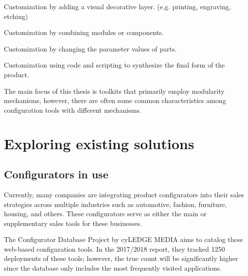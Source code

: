 \begin{definition}[Veneer]
Customization by adding a visual decorative layer. (e.g. printing, engraving, etching)
\end{definition}
\begin{definition}[Modularity]
Customization by combining modules or components.
\end{definition}
\begin{definition}[Parametric]
Customization by changing the parameter values of parts.
\end{definition}
\begin{definition}[Generative]
Customization using code and scripting to synthesize the final form of the product.
\end{definition}

The main focus of this thesis is toolkits that primarily employ modularity mechanisms, however, there are often some common characteristics among configuration tools with different mechanisms.

\section{Exploring existing solutions}
\subsection{Configurators in use}

Currently, many companies are integrating product configurators into their sales strategies across multiple industries such as automotive, fashion, furniture, housing, and others. These configurators serve as either the main or supplementary sales tools for these businesses.

The Configurator Database Project by cyLEDGE MEDIA aims to catalog these web-based configuration tools. In the 2017/2018 report, they tracked 1250 deployments of these tools; however, the true count will be significantly higher since the database only includes the most frequently visited applications. \cite{cyLEDGE2018}

